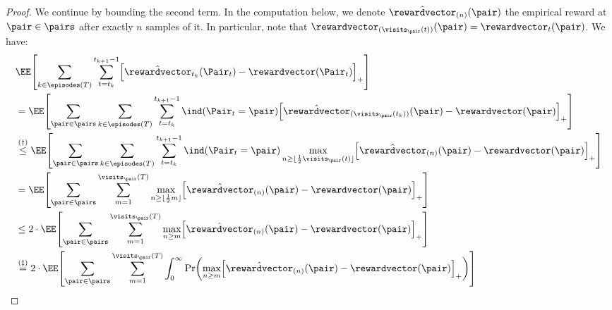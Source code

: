 \documentclass[preprint,cleveref,12pt]{colt2025}
\DeclarePairedDelimiter{\brackets}{[}{]}	%
\DeclarePairedDelimiter{\parens}{(}{)}	%
\DeclarePairedDelimiter{\floor}{\lfloor}{\rfloor}	%
\DeclarePairedDelimiter{\pospart}{[}{]_{+}}	%
\def\integral{\int}
\newcommand{\indic}[1]{\ind\parens{#1}}
\def\indicator{\indic}
\def\reward{\rewardvector}
\begin{document}
\begin{proof}
        We continue by bounding the second term.
        In the computation below, we denote $\hat{\reward}_{(n)}(\pair)$ the empirical reward at $\pair \in \pairs$ after exactly $n$ samples of it. 
        In particular, note that $\reward_{(\visits_{\pair}(t))}(\pair) = \reward_t(\pair)$. 
        We have:
        \begin{align*}
            & 
            \EE \brackets*{
                \sum_{k \in \episodes(T)}
                \sum_{t = t_k}^{t_{k+1}-1}
                \pospart*{
                    \hat{\reward}_{t_k}(\Pair_t) - \reward(\Pair_t)
                }
            }
            \\
            & =
            \EE \brackets*{
                \sum_{\pair \in \pairs}
                \sum_{k \in \episodes(T)}
                \sum_{t=t_k}^{t_{k+1}-1}
                \indicator{\Pair_t = \pair}
                \pospart*{
                    \hat{\reward}_{(\visits_{\pair}(t_k))}(\pair) - \reward(\pair)
                }
            }
            \\
            & \overset{(\dagger)}\le 
            \EE \brackets*{
                \sum_{\pair \in \pairs}
                \sum_{k \in \episodes(T)}
                \sum_{t=t_k}^{t_{k+1}-1}
                \indicator{\Pair_t = \pair}
                \max_{n \ge \floor{\frac 12 \visits_\pair (t)}}
                \pospart*{
                    \hat{\reward}_{(n)}(\pair) - \reward(\pair)
                }
            }
            \\
            & =
            \EE \brackets*{
                \sum_{\pair \in \pairs}
                \sum_{m=1}^{\visits_\pair(T)}
                \max_{n \ge \floor{\frac 12 m}}
                \pospart*{
                    \hat{\reward}_{(n)}(\pair) - \reward(\pair)
                }
            }
            \\
            & \le
            2 \cdot \EE \brackets*{
                \sum_{\pair \in \pairs}
                \sum_{m=1}^{\visits_\pair(T)}
                \max_{n \ge m}
                \pospart*{
                    \hat{\reward}_{(n)}(\pair) - \reward(\pair)
                }
            }
            \\
            & \overset{(\ddagger)}=
            2 \cdot \EE \brackets*{
                \sum_{\pair \in \pairs}
                \sum_{m=1}^{\visits_\pair(T)}
                \integral_0^\infty
                \Pr \parens*{
                    \max_{n \ge m}
                    \pospart*{
                        \hat{\reward}_{(n)}(\pair) - \reward(\pair)
}}}
\end{align*}
\end{proof}
\end{document}
